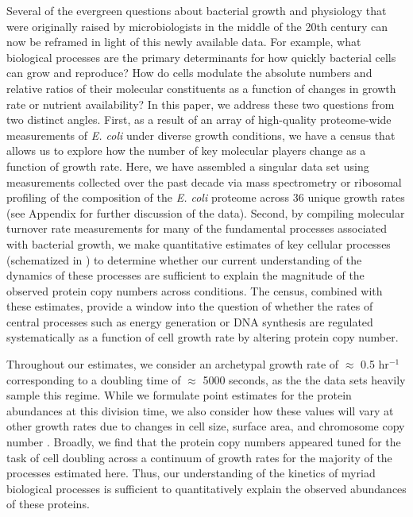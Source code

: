 Several of the evergreen questions about bacterial growth and physiology that
were originally raised by microbiologists in the middle of the 20th century
can now be reframed in light of this newly available data. For example, what
biological processes are the primary determinants for how quickly bacterial
cells can grow and reproduce? How do cells modulate the absolute numbers and
relative ratios of their molecular constituents as a function of changes in
growth rate or nutrient availability? In this paper, we address these two
questions from two distinct angles. First, as a result of an array of
high-quality proteome-wide measurements of \textit{E. coli} under diverse
growth conditions, we have a census that allows us to explore how the number
of key molecular players change as a function of growth rate. Here, we have
assembled a singular data set using measurements collected over the past
decade via mass spectrometry \citep{schmidt2016, peebo2015, valgepea2013} or
ribosomal profiling \citep{li2014} of the composition of the \textit{E. coli}
proteome across 36 unique growth rates (see Appendix
 for further discussion of the data). Second, by
compiling molecular turnover rate measurements for many of the fundamental
processes associated with bacterial growth, we make quantitative estimates of
key cellular processes (schematized in ) to determine whether
our current understanding of the dynamics of these processes are sufficient
to explain the magnitude of the observed protein copy numbers across
conditions. The census, combined with these estimates, provide a window into
the question of whether the rates of central processes such as energy
generation or DNA synthesis are regulated systematically as a function of
cell growth rate by altering protein copy number.

Throughout our estimates, we consider an archetypal growth rate of $\approx$ 0.5
hr$^{-1}$ corresponding to a doubling time of $\approx$ 5000 seconds, as the the
data sets heavily sample this regime. While we formulate point estimates for the
protein abundances at this division time, we also consider how these values will vary
at other growth rates due to changes in cell size, surface area, and chromosome
copy number \citep{taheriaraghi2015}. Broadly, we find that the protein copy
numbers appeared tuned for the task of cell doubling across a continuum of
growth rates for the majority of the processes estimated here. Thus, our understanding of the kinetics of
myriad biological processes is sufficient to quantitatively explain the
observed abundances of these proteins.

